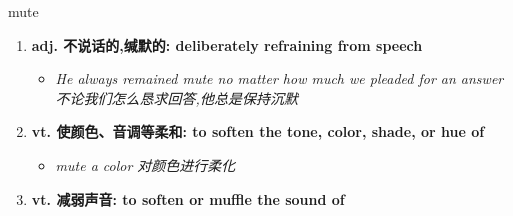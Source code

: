
\begin{frame}
{\huge mute}
\begin{center}
\begin{enumerate}\Large
  \item \textbf{adj. 不说话的,缄默的: deliberately refraining from speech}
  \begin{itemize}
    \item \em{\Large{He always remained mute no matter how much we pleaded for an answer 不论我们怎么恳求回答,他总是保持沉默}}
  \end{itemize}
  \item \textbf{vt. 使颜色、音调等柔和: to soften the tone, color, shade, or hue of}
  \begin{itemize}
    \item \em{\Large{mute a color 对颜色进行柔化}}
  \end{itemize}
  \item \textbf{vt. 减弱声音: to soften or muffle the sound of}
\end{enumerate}
\end{center}
\end{frame}
